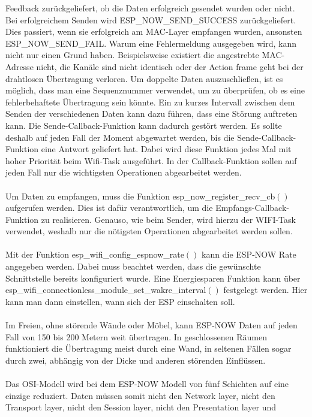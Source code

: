 \documentclass[titlepage,12pt,twoside]{article}
\begin{document}
Feedback zurückgeliefert, ob die Daten erfolgreich gesendet wurden oder 
nicht. Bei erfolgreichem Senden wird ESP\_NOW\_SEND\_SUCCESS zurückgeliefert. 
Dies passiert, wenn sie erfolgreich am MAC-Layer empfangen wurden, ansonsten 
ESP\_NOW\_SEND\_FAIL. Warum eine Fehlermeldung ausgegeben wird, kann nicht 
nur einen Grund haben. Beispielsweise existiert die angestrebte MAC-Adresse 
nicht, die Kanäle sind nicht identisch oder der Action frame geht bei der 
drahtlosen Übertragung verloren. Um doppelte Daten auszuschließen, ist es 
möglich, dass man eine Sequenznummer verwendet, um zu überprüfen, ob es eine 
fehlerbehaftete Übertragung sein könnte. Ein zu kurzes Intervall zwischen 
dem Senden der verschiedenen Daten kann dazu führen, dass eine Störung 
auftreten kann. Die Sende-Callback-Funktion kann dadurch gestört werden. Es 
sollte deshalb auf jeden Fall der Moment abgewartet werden, bis die Sende-Callback-Funktion 
eine Antwort geliefert hat. Dabei wird diese Funktion jedes Mal mit hoher 
Priorität beim Wifi-Task ausgeführt. In der Callback-Funktion sollen auf 
jeden Fall nur die wichtigsten Operationen abgearbeitet werden. \\
\\
Um Daten zu empfangen, muss die Funktion esp\_now\_register\_recv\_cb$()$ aufgerufen 
werden. Dies ist dafür verantwortlich, um die Empfangs-Callback-Funktion zu 
realisieren. Genauso, wie beim Sender, wird hierzu der WIFI-Task verwendet, 
weshalb nur die nötigsten Operationen abgearbeitet werden sollen. \\
\\
Mit der Funktion esp\_wifi\_config\_espnow\_rate$()$ kann die ESP-NOW Rate angegeben 
werden. Dabei muss beachtet werden, dass die gewünschte Schnittstelle bereits 
konfiguriert wurde. Eine Energiesparen Funktion kann über 
esp\_wifi\_connectionless\_module\_set\_wakre\_interval$()$ festgelegt werden. Hier 
kann man dann einstellen, wann sich der ESP einschalten soll. \\
\\
Im Freien, ohne störende Wände oder Möbel, kann ESP-NOW Daten auf jeden Fall von 150 
bis 200 Metern weit übertragen. In geschlossenen Räumen funktioniert die Übertragung 
meist durch eine Wand, in seltenen Fällen sogar durch zwei, abhängig von der Dicke 
und anderen störenden Einflüssen. \\
\\
Das OSI-Modell wird bei dem ESP-NOW Modell von fünf Schichten auf eine 
einzige reduziert. Daten müssen somit nicht den Network layer, nicht den 
Transport layer, nicht den Session layer, nicht den Presentation layer und 
\end{document}
